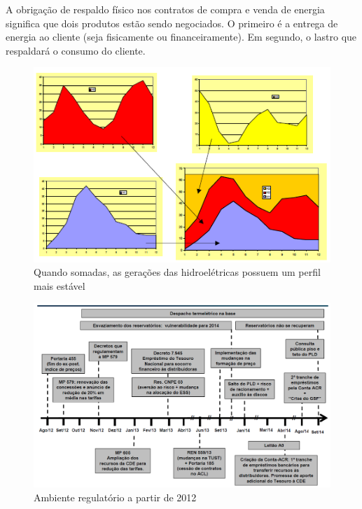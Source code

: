 A obrigação de respaldo físico nos contratos de compra e venda de
energia significa que dois produtos estão sendo negociados. O primeiro
é a entrega de energia ao cliente (seja fisicamente ou financeiramente).
Em segundo, o lastro que respaldará o consumo do cliente.

\begin{figure}
\begin{centering}
\includegraphics{anexos/aula110-7}
\par\end{centering}

\protect\caption{Quando somadas, as gerações das hidroelétricas possuem um perfil mais
estável\label{fig:Quando-somadas}}
\end{figure}


\begin{figure}
\includegraphics[scale=0.5]{anexos/aula110-}\protect\caption{Ambiente regulatório a partir de 2012 \label{fig:Ambiente-regulat=0000F3rio-a}}
\end{figure}


